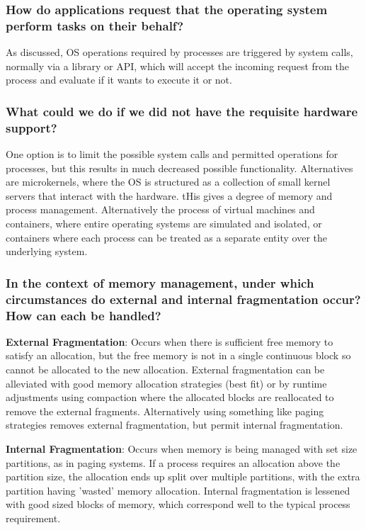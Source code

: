 \documentclass[]{article}
\begin{document}
        \subsubsection{How do applications request that the operating system perform tasks on their behalf?}

            As discussed, OS operations required by processes are triggered by system calls, normally via a library or API, which will accept the incoming request from the process and evaluate if it wants to execute it or not.

        \subsubsection{What could we do if we did not have the requisite hardware support?}

            One option is to limit the possible system calls and permitted operations for processes, but this results in much decreased possible functionality. Alternatives are microkernels, where the OS is structured as a collection of small kernel servers that interact with the hardware. tHis gives a degree of memory and process management. Alternatively the process of virtual machines and containers, where entire operating systems are simulated and isolated, or containers where each process can be treated as a separate entity over the underlying system.

        \subsubsection{In the context of memory management, under which circumstances do external and internal fragmentation occur? How can each be handled?}

        \textbf{External Fragmentation}: Occurs when there is sufficient free memory to satisfy an allocation, but the free memory is not in a single continuous block so cannot be allocated to the new allocation. External fragmentation can be alleviated with good memory allocation strategies (best fit) or by runtime adjustments using compaction where the allocated blocks are reallocated to remove the external fragments. Alternatively using something like paging strategies removes external fragmentation, but permit internal fragmentation.

        \textbf{Internal Fragmentation}: Occurs when memory is being managed with set size partitions, as in paging systems. If a process requires an allocation above the partition size, the allocation ends up split over multiple partitions, with the extra partition having 'wasted' memory allocation. Internal fragmentation is lessened with good sized blocks of memory, which correspond well to the typical process requirement.
\end{document}
